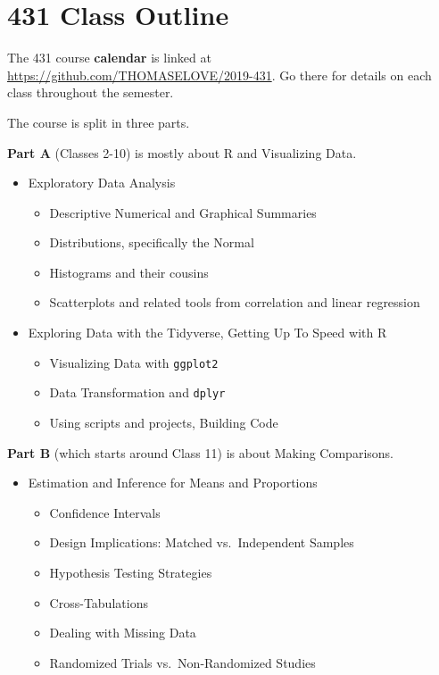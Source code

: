 \documentclass[
]{book}
\providecommand{\tightlist}{%
  \setlength{\itemsep}{0pt}\setlength{\parskip}{0pt}}
\begin{document}
\hypertarget{class-outline}{%
\section{431 Class Outline}\label{class-outline}}

The 431 course \textbf{calendar} is linked at \url{https://github.com/THOMASELOVE/2019-431}. Go there for details on each class throughout the semester.

The course is split in three parts.

\textbf{Part A} (Classes 2-10) is mostly about R and Visualizing Data.

\begin{itemize}
\tightlist
\item
  Exploratory Data Analysis

  \begin{itemize}
  \tightlist
  \item
    Descriptive Numerical and Graphical Summaries
  \item
    Distributions, specifically the Normal
  \item
    Histograms and their cousins
  \item
    Scatterplots and related tools from correlation and linear regression
  \end{itemize}
\item
  Exploring Data with the Tidyverse, Getting Up To Speed with R

  \begin{itemize}
  \tightlist
  \item
    Visualizing Data with \texttt{ggplot2}
  \item
    Data Transformation and \texttt{dplyr}
  \item
    Using scripts and projects, Building Code
  \end{itemize}
\end{itemize}

\textbf{Part B} (which starts around Class 11) is about Making Comparisons.

\begin{itemize}
\tightlist
\item
  Estimation and Inference for Means and Proportions

  \begin{itemize}
  \tightlist
  \item
    Confidence Intervals
  \item
    Design Implications: Matched vs.~Independent Samples
  \item
    Hypothesis Testing Strategies
  \item
    Cross-Tabulations
  \item
    Dealing with Missing Data
  \item
    Randomized Trials vs.~Non-Randomized Studies
  \end{itemize}
\end{itemize}
\end{document}
